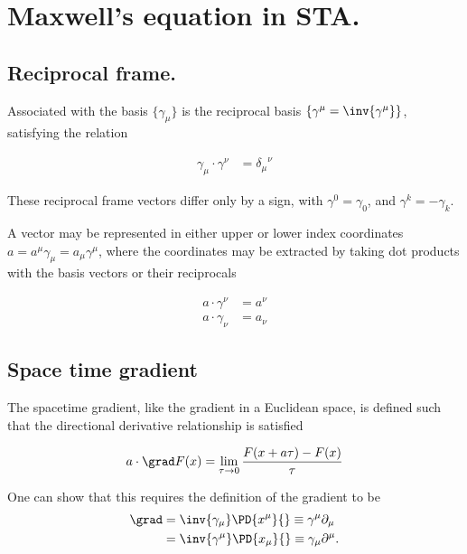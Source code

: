 
%

\chapter{Maxwell's equation in STA.}
\label{chap:maxwellsFromGA}
\date{Nov 8, 2010}

\beginArtWithToc

\section{Reciprocal frame.}

Associated with the basis $\{\gamma_\mu\}$ is the reciprocal basis $\{\gamma^\mu = \inv{\gamma^\mu}\}$, satisfying the relation

\begin{align*}
\gamma_\mu \cdot \gamma^\nu &= {\delta_\mu}^\nu 
\end{align*}

These reciprocal frame vectors differ only by a sign, with $\gamma^0 = \gamma_0$, and $\gamma^k = -\gamma_k$.

A vector may be represented in either upper or lower index coordinates $a = a^\mu \gamma_\mu = a_\mu \gamma^\mu$, where the coordinates may be extracted by taking dot products with the basis vectors or their reciprocals

\begin{align*}
a \cdot \gamma^\nu &= a^\nu \\
a \cdot \gamma_\nu &= a_\nu
\end{align*}

\section{Space time gradient}

The spacetime gradient, like the gradient in a Euclidean space, is defined such that the directional derivative relationship is satisfied

\begin{align*}
a \cdot \grad F(x)= \lim_{\tau \rightarrow 0} \frac{F(x + a\tau) - F(x)}{\tau}
\end{align*}

One can show that this requires the definition of the gradient to be
\begin{align*}
\grad &= \inv{\gamma_\mu} \PD{x^\mu}{} \equiv \gamma^\mu \partial_\mu \\
      &= \inv{\gamma^\mu} \PD{x_\mu}{} \equiv \gamma_\mu \partial^\mu.
\end{align*}


